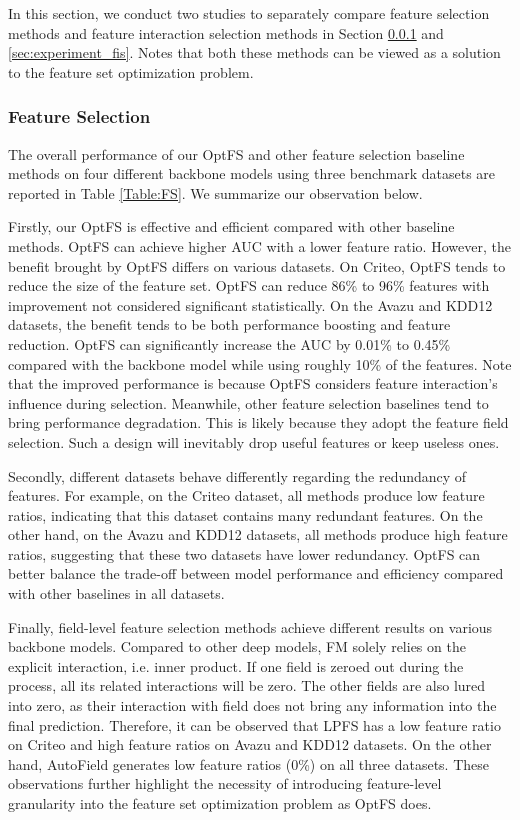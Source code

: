 \documentclass[sigconf]{acmart}
\begin{document}
In this section, we conduct two studies to separately compare feature selection methods and feature interaction selection methods in Section \ref{sec:experiment_fs} and \ref{sec:experiment_fis}. Notes that both these methods can be viewed as a solution to the feature set optimization problem.

\subsubsection{Feature Selection}
\label{sec:experiment_fs}
The overall performance of our OptFS and other feature selection baseline methods on four different backbone models using three benchmark datasets are reported in Table \ref{Table:FS}. We summarize our observation below.

Firstly, our OptFS is effective and efficient compared with other baseline methods. OptFS can achieve higher AUC with a lower feature ratio. However, the benefit brought by OptFS differs on various datasets. On Criteo, OptFS tends to reduce the size of the feature set. OptFS can reduce 86\% to 96\% features with improvement not considered significant statistically. On the Avazu and KDD12 datasets, the benefit tends to be both performance boosting and feature reduction. OptFS can significantly increase the AUC by 0.01\% to 0.45\% compared with the backbone model while using roughly 10\% of the features. Note that the improved performance is because OptFS considers feature interaction's influence during selection.
Meanwhile, other feature selection baselines tend to bring performance degradation. This is likely because they adopt the feature field selection. Such a design will inevitably drop useful features or keep useless ones.

Secondly, different datasets behave differently regarding the redundancy of features. For example, on the Criteo dataset, all methods produce low feature ratios, indicating that this dataset contains many redundant features. On the other hand, on the Avazu and KDD12 datasets, all methods produce high feature ratios, suggesting that these two datasets have lower redundancy. 
OptFS can better balance the trade-off between model performance and efficiency compared with other baselines in all datasets.



Finally, field-level feature selection methods achieve different results on various backbone models. Compared to other deep models, FM solely relies on the explicit interaction, i.e. inner product. If one field  is zeroed out during the process, all its related interactions will be zero. The other fields are also lured into zero, as their interaction with field  does not bring any information into the final prediction. Therefore, it can be observed that LPFS has a low feature ratio on Criteo and high feature ratios on Avazu and KDD12 datasets. On the other hand, AutoField generates low feature ratios (0\%) on all three datasets. These observations further highlight the necessity of introducing feature-level granularity into the feature set optimization problem as OptFS does. 
\end{document}
